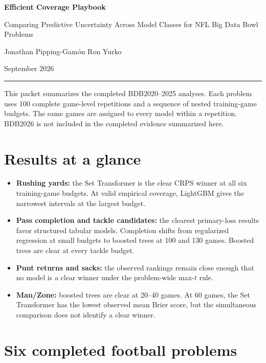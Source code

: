 \documentclass[10pt,letterpaper]{article}
\newcommand{\role}[1]{\textbf{#1}}
\begin{document}
\begin{center}
  {\LARGE\bfseries Efficient Coverage Playbook\par}
  \vspace{0.35em}
  {\large\textcolor{cmured}{Comparing Predictive Uncertainty Across Model Classes for NFL Big Data Bowl Problems}\par}
  \vspace{0.65em}
  {Jonathan Pipping-Gam\'on \qquad Ron Yurko\par}
  \vspace{0.25em}
  {\small September 2026\par}
\end{center}

\vspace{0.4em}
\hrule
\vspace{0.75em}

This packet summarizes the completed BDB2020--2025 analyses. Each problem uses 100 complete game-level repetitions and a sequence of nested training-game budgets. The same games are assigned to every model within a repetition. BDB2026 is not included in the completed evidence summarized here.

\section*{Results at a glance}

\begin{itemize}
  \item \role{Rushing yards:} the Set Transformer is the clear CRPS winner at all six training-game budgets. At valid empirical coverage, LightGBM gives the narrowest intervals at the largest budget.
  \item \role{Pass completion and tackle candidates:} the clearest primary-loss results favor structured tabular models. Completion shifts from regularized regression at small budgets to boosted trees at 100 and 130 games. Boosted trees are clear at every tackle budget.
  \item \role{Punt returns and sacks:} the observed rankings remain close enough that no model is a clear winner under the problem-wide max-$t$ rule.
  \item \role{Man/Zone:} boosted trees are clear at 20--40 games. At 60 games, the Set Transformer has the lowest observed mean Brier score, but the simultaneous comparison does not identify a clear winner.
\end{itemize}

\section*{Six completed football problems}
\end{document}
